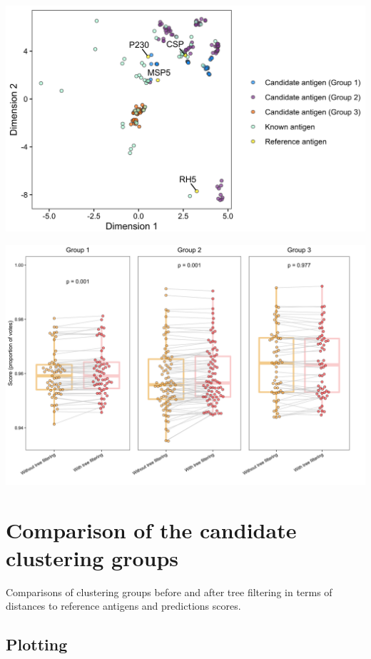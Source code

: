 \documentclass[
  11pt,
  oneside]{book}
\begin{document}
\begin{center}\includegraphics[width=1\linewidth]{./figures/Fig 4} \end{center}

\begin{center}\includegraphics[width=1\linewidth]{./figures/Supplementary Fig 8} \end{center}

\hypertarget{comparison-of-the-candidate-clustering-groups}{%
\section{Comparison of the candidate clustering groups}\label{comparison-of-the-candidate-clustering-groups}}

Comparisons of clustering groups before and after tree filtering in terms of distances to reference antigens and predictions scores.

\hypertarget{plotting-6}{%
\subsection{Plotting}\label{plotting-6}}
\end{document}

